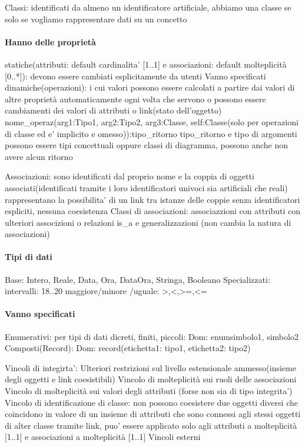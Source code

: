 \documentclass[12pt]{article}
\begin{document}
\onehalfspacing
\justifying

Classi: identificati da almeno un identificatore artificiale, abbiamo una classe se solo se vogliamo rappresentare dati su un concetto
\paragraph{Hanno delle proprietà}
		statiche(attributi: default cardinalita' [1..1] e associazioni: default molteplicità [0..*]): devono essere cambiati esplicitamente da utenti
	Vanno specificati 
		dinamiche(operazioni): i cui valori possono essere calcolati a partire dai valori di altre proprietà automaticamente ogni volta che servono
			o possono essere cambiamenti dei valori di attributi o link(stato dell'oggetto)
			nome_operaz(arg1:Tipo1, arg2:Tipo2, arg3:Classe, self:Classe(solo per operazioni di classe ed e' implicito e omesso)):tipo_ritorno
				tipo_ritorno e tipo di argomenti possono essere tipi concettuali oppure classi di diagramma, possono anche non avere alcun ritorno

Associazioni: sono identificati dal proprio nome e la coppia di oggetti associati(identificati tramite i loro identificatori univoci sia artificiali che reali) rappresentano la possibilita' di un link tra istanze delle coppie senza identificatori espliciti, nessuna coesistenza
	Classi di associazioni: associazzioni con attributi con ulteriori associzioni o relazioni is_a e generalizzazioni (non cambia la natura di associazioni)

\paragraph{Tipi di dati}
	Base: Intero, Reale, Data, Ora, DataOra, Stringa, Booleano
	Specializzati:	intervalli: 18..20
		maggiore/minore /uguale: >,<,>=,<=
\paragraph{Vanno specificati}
	Enumerativi: per tipi di dati dicreti, finiti, piccoli: Dom: enum{simbolo1, simbolo2}
	Composti(Record): Dom: record(etichetta1: tipo1, etichetta2: tipo2)

Vincoli di integirta': Ulteriori restrizioni sul livello estensionale ammesso(insieme degli oggetti e link coesistibili)
	Vincolo di molteplicità sui ruoli delle associazioni
	Vincolo di molteplicità sui valori degli attributi (forse non sia di tipo integrita')
	Vincolo di identificazione di classe: non possono coesistere due oggetti diversi che coincidono in valore di un insieme di attributi che sono connessi agli stessi oggetti di alter classe tramite link, puo' essere applicato solo agli attributi a molteplicità [1..1] e associazioni a molteplicità [1..1]
	Vincoli esterni	
	
\end{document}
